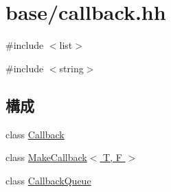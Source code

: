 \hypertarget{callback_8hh}{
\section{base/callback.hh}
\label{callback_8hh}
}
{\ttfamily \#include $<$list$>$}\par
{\ttfamily \#include $<$string$>$}\par
\subsection*{構成}
\begin{DoxyCompactItemize}
\item 
class \hyperlink{classCallback}{Callback}
\item 
class \hyperlink{classMakeCallback}{MakeCallback$<$ T, F $>$}
\item 
class \hyperlink{classCallbackQueue}{CallbackQueue}
\end{DoxyCompactItemize}

